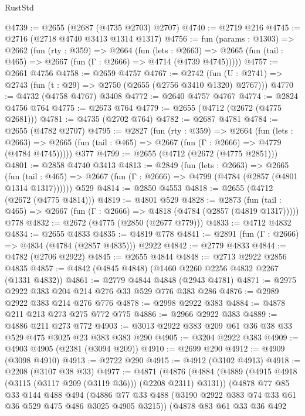 \begin{lexlean}{RustStd}
\begin{coremodule}
@4739 := @2655 (@2687 (@4735 @2703) @2707)
@4740 := @2719 @216
@4745 := @2716 (@2718 @4740 @3413 @1314 @1317)
@4756 := fun (params : @1303) =>
  @2662
    (fun (rty : @359) =>
    @2664
      (fun (lets : @2663) =>
      @2665 (fun (tail : @465) => @2667 (fun (Γ : @2666) => @4714 (@4739 @4745)))))
@4757 := @2661 @4756
@4758 := @2659 @4757
@4767 := @2742 (fun (U : @2741) => @2743 (fun (t : @29) => @2750 (@2655 (@2756 @3410 @1320) @2767)))
@4770 := @4732 (@4758 @4767) @3408
@4772 := @2640 @4757 @4767
@4774 := @2824 @4756 @764
@4775 := @2673 @764
@4779 := @2655 (@4712 (@2672 (@4775 @2681)))
@4781 := @4735 (@2702 @764)
@4782 := @2687 @4781
@4784 := @2655 (@4782 @2707)
@4795 := @2827
    (fun (rty : @359) =>
    @2664
      (fun (lets : @2663) =>
      @2665 (fun (tail : @465) => @2667 (fun (Γ : @2666) => @4779 (@4784 @4745)))))
    @377
@4799 := @2655 (@4712 (@2672 (@4775 @2851)))
@4801 := @2858 @4740 @3413
@4813 := @2849
    (fun (lets : @2663) =>
    @2665
      (fun (tail : @465) => @2667 (fun (Γ : @2666) => @4799 (@4784 (@2857 (@4801 @1314 @1317))))))
    @529
@4814 := @2850 @4553
@4818 := @2655 (@4712 (@2672 (@4775 @4814)))
@4819 := @4801 @529
@4828 := @2873
    (fun (tail : @465) => @2667 (fun (Γ : @2666) => @4818 (@4784 (@2857 (@4819 @1317)))))
    @778
@4832 := @2672 (@4775 (@2850 (@2677 @779)))
@4833 := @4712 @4832
@4834 := @2655 @4833
@4835 := @4819 @778
@4841 := @2891 (fun (Γ : @2666) => @4834 (@4784 (@2857 @4835))) @2922
@4842 := @2779 @4833
@4844 := @4782 (@2706 @2922)
@4845 := @2655 @4844
@4848 := @2713 @2922 @2856 @4835
@4857 := @4842 (@4845 @4848) (@1460 @2260 @2256 @4832 @2267 (@1331 @4832))
@4861 := @2779 @4844 @4848 (@2943 @4781)
@4871 := @2975 @2922 @383 @204 @214 @276 @33 @529 @776 @383 @286
@4876 := @2989 @2922 @383 @214 @276 @776
@4878 := @2998 @2922 @383
@4884 := @4878 @211 @213 @273 @275 @772 @775
@4886 := @2966 @2922 @383
@4889 := @4886 @211 @273 @772
@4903 := @3013 @2922 @383 @209 @61 @36 @38 @33 @529 @475 @3025 @23 @383 @383 @290
@4905 := @3204 @2922 @383
@4909 := @4903 @4905 (@2381 (@3094 @209))
@4910 := @2699 @290
@4912 := @4909 (@3098 @4910)
@4913 := @2722 @290
@4915 := @4912 (@3102 @4913)
@4918 := @2208 (@3107 @38 @33)
@4977 := @4871
    (@4876
      (@4884
        (@4889 (@4915 @4918 (@3115 (@3117 @209 (@3119 @36))) (@2208 @2311) @3131))
        (@4878
          @77
          @85
          @33
          @144
          @488
          @494
          (@4886 @77 @33 @488 (@3190 @2922 @383 @74 @33 @61 @36 @529 @475 @486 @3025 @4905 @3215))
          (@4878
            @83
            @61
            @33
            @36
            @492

\end{coremodule}
\end{lexlean}
